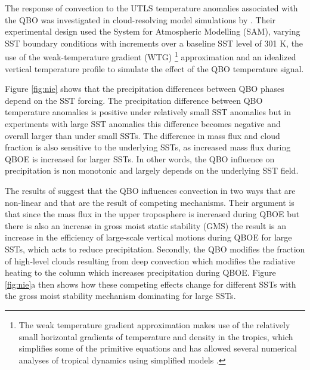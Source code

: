  The response of convection to the UTLS temperature anomalies associated with the QBO was investigated in cloud-resolving model simulations by \cite{nie2015}. Their experimental design used the System for Atmospheric Modelling (SAM), varying SST boundary conditions with increments over a baseline SST level of 301 K, the use of the weak-temperature gradient (WTG) \footnote{The weak temperature gradient approximation makes use of the relatively small horizontal gradients of temperature and density in the tropics, which simplifies some of the primitive equations and has allowed several numerical analyses of tropical dynamics using simplified models \citep{sobel2001wtg}.} approximation and an idealized vertical temperature profile to simulate the effect of the QBO temperature signal. 
 
 Figure \ref{fig:nie} shows that the precipitation differences between QBO phases depend on the SST forcing.   The precipitation difference between QBO temperature anomalies is positive under relatively small SST anomalies but in experiments with large SST anomalies this difference becomes negative and overall larger than under small SSTs. The difference in mass flux and cloud fraction is also sensitive to the underlying SSTs, as increased mass flux during QBOE is increased for larger SSTs.  In other words, the QBO influence on precipitation is non monotonic and largely depends on the underlying SST field.
 
  The results of \cite{nie2015} suggest that the QBO influences convection in two ways that are non-linear and that are the result of competing mechanisms. Their argument is that since  the mass flux in the upper troposphere is increased during QBOE but there is also an increase in gross moist static stability (GMS) the result is an increase in the efficiency of large-scale vertical motions during QBOE for large SSTs, which acts to reduce precipitation.  Secondly, the QBO modifies the fraction of high-level clouds resulting from deep convection which modifies the radiative heating to the column which increases precipitation during QBOE.  Figure \ref{fig:nie}a then shows how these competing effects change for different SSTs with the gross moist stability mechanism dominating for large SSTs.

